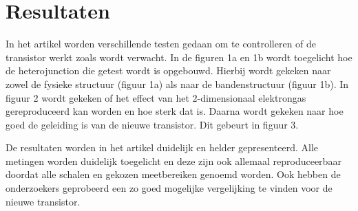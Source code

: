 \documentclass[11pt]{article}
\begin{document}
\newpage

\section{Resultaten}
In het artikel worden verschillende testen gedaan om te controlleren of de transistor werkt zoals wordt verwacht. In de figuren 1a en 1b wordt toegelicht hoe de heterojunction die getest wordt is opgebouwd. Hierbij wordt gekeken naar zowel de fysieke structuur (figuur 1a) als naar de bandenstructuur (figuur 1b).
In figuur 2 wordt gekeken of het effect van het 2-dimensionaal elektrongas gereproduceerd kan worden en hoe sterk dat is. Daarna wordt gekeken naar hoe goed de geleiding is van de nieuwe transistor. Dit gebeurt in figuur 3.

De resultaten worden in het artikel duidelijk en helder gepresenteerd. Alle metingen worden duidelijk toegelicht en deze zijn ook allemaal reproduceerbaar doordat alle schalen en gekozen meetbereiken genoemd worden. Ook hebben de onderzoekers geprobeerd een zo goed mogelijke vergelijking te vinden voor de nieuwe transistor.
\end{document}
